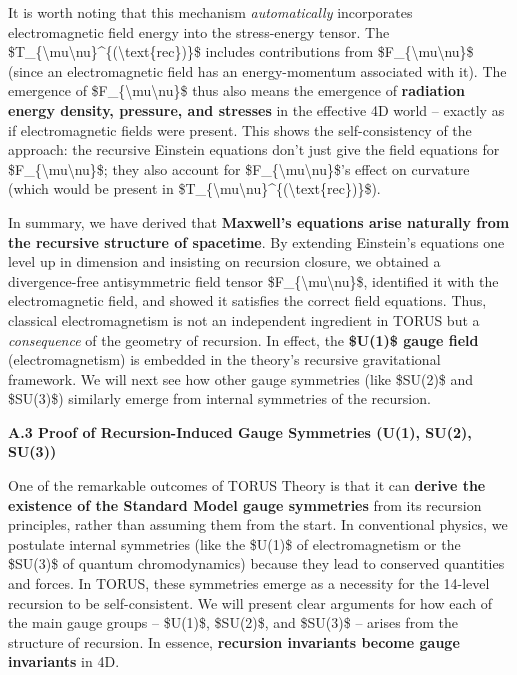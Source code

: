 \documentclass[
]{article}
\begin{document}
{It is worth noting that this mechanism \emph{automatically} incorporates
electromagnetic field energy into the stress-energy tensor. The
\$T\_\{\textbackslash mu\textbackslash nu\}\^{}\{(\textbackslash text\{rec\})\}\$
includes contributions from
\$F\_\{\textbackslash mu\textbackslash nu\}\$ (since an electromagnetic
field has an energy-momentum associated with it). The emergence of
\$F\_\{\textbackslash mu\textbackslash nu\}\$ thus also means the
emergence of \textbf{radiation energy density, pressure, and stresses}
in the effective 4D world -- exactly as if electromagnetic fields were
present. This shows the self-consistency of the approach: the recursive
Einstein equations don't just give the field equations for
\$F\_\{\textbackslash mu\textbackslash nu\}\$; they also account for
\$F\_\{\textbackslash mu\textbackslash nu\}\$'s effect on curvature
(which would be present in
\$T\_\{\textbackslash mu\textbackslash nu\}\^{}\{(\textbackslash text\{rec\})\}\$).

In summary, we have derived that \textbf{Maxwell's equations arise
naturally from the recursive structure of spacetime}. By extending
Einstein's equations one level up in dimension and insisting on
recursion closure, we obtained a divergence-free antisymmetric field
tensor \$F\_\{\textbackslash mu\textbackslash nu\}\$, identified it with
the electromagnetic field, and showed it satisfies the correct field
equations\hspace{0pt}. Thus, classical electromagnetism is not an
independent ingredient in TORUS but a \emph{consequence} of the geometry
of recursion. In effect, the \textbf{\$U(1)\$ gauge field}
(electromagnetism) is embedded in the theory's recursive gravitational
framework\hspace{0pt}. We will next see how other gauge symmetries (like
\$SU(2)\$ and \$SU(3)\$) similarly emerge from internal symmetries of
the recursion.

\textbf{A.3 Proof of Recursion-Induced Gauge Symmetries (U(1), SU(2),
SU(3))}

One of the remarkable outcomes of TORUS Theory is that it can
\textbf{derive the existence of the Standard Model gauge symmetries}
from its recursion principles, rather than assuming them from the start.
In conventional physics, we postulate internal symmetries (like the
\$U(1)\$ of electromagnetism or the \$SU(3)\$ of quantum chromodynamics)
because they lead to conserved quantities and forces. In TORUS, these
symmetries emerge as a necessity for the 14-level recursion to be
self-consistent\hspace{0pt}. We will present clear arguments for how
each of the main gauge groups -- \$U(1)\$, \$SU(2)\$, and \$SU(3)\$ --
arises from the structure of recursion. In essence, \textbf{recursion
invariants become gauge invariants} in 4D.

}
\end{document}
